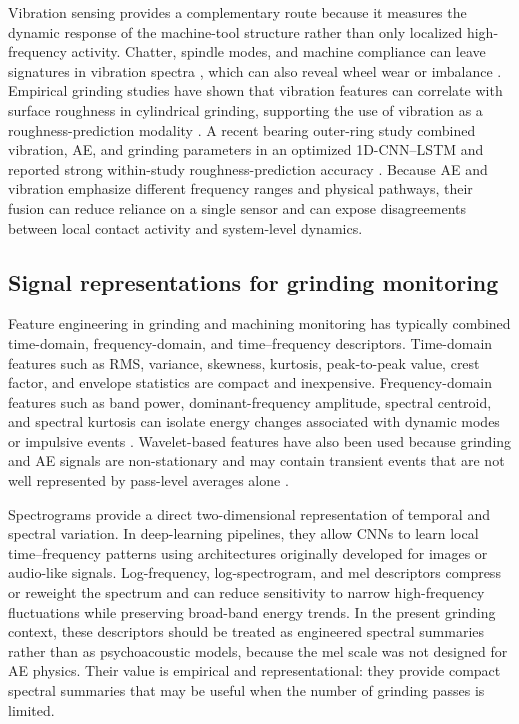 Vibration sensing provides a complementary route because it measures the dynamic response of the machine-tool structure rather than only localized high-frequency activity. Chatter, spindle modes, and machine compliance can leave signatures in vibration spectra \cite{Altintas2004}, which can also reveal wheel wear or imbalance \cite{Quintana2011}. Empirical grinding studies have shown that vibration features can correlate with surface roughness in cylindrical grinding, supporting the use of vibration as a roughness-prediction modality \cite{Hassui2003}. A recent bearing outer-ring study combined vibration, AE, and grinding parameters in an optimized 1D-CNN--LSTM and reported strong within-study roughness-prediction accuracy \cite{Chen2025PrecisionGrinding}. Because AE and vibration emphasize different frequency ranges and physical pathways, their fusion can reduce reliance on a single sensor and can expose disagreements between local contact activity and system-level dynamics.

\subsection{Signal representations for grinding monitoring}\label{rw:representations}

Feature engineering in grinding and machining monitoring has typically combined time-domain, frequency-domain, and time--frequency descriptors. Time-domain features such as RMS, variance, skewness, kurtosis, peak-to-peak value, crest factor, and envelope statistics are compact and inexpensive. Frequency-domain features such as band power, dominant-frequency amplitude, spectral centroid, and spectral kurtosis can isolate energy changes associated with dynamic modes or impulsive events \cite{Antoni2006}. Wavelet-based features have also been used because grinding and AE signals are non-stationary and may contain transient events that are not well represented by pass-level averages alone \cite{Teti2010}.

Spectrograms provide a direct two-dimensional representation of temporal and spectral variation. In deep-learning pipelines, they allow CNNs to learn local time--frequency patterns using architectures originally developed for images or audio-like signals. Log-frequency, log-spectrogram, and mel descriptors compress or reweight the spectrum and can reduce sensitivity to narrow high-frequency fluctuations while preserving broad-band energy trends. In the present grinding context, these descriptors should be treated as engineered spectral summaries rather than as psychoacoustic models, because the mel scale was not designed for AE physics. Their value is empirical and representational: they provide compact spectral summaries that may be useful when the number of grinding passes is limited.

